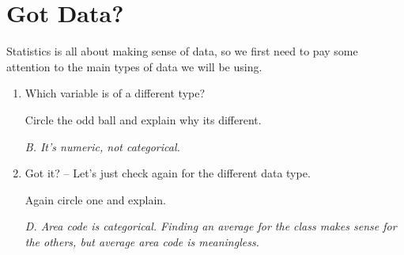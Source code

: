 \def\theTopic{Descriptive Stats }
\def\dayNum{2}

\section{ Got Data?}

Statistics is all about making sense of data, so we first need to pay
some attention to the main types of data we will be using.

\begin{enumerate}
  \item Which  variable is of a  different type?
     Circle the odd ball and explain why its different.
\begin{students}
    \vspace{1cm}    
\end{students}

\begin{key}
  {\it B.  It's numeric, not categorical.}       
\end{key}

\item Got it?  -- Let's just check again for the different data type.
   Again circle one and explain.
\begin{students}
    \vspace{1cm}
\end{students}

\begin{key}
  {\it D.  Area code is categorical. Finding an average for the class
    makes sense for the others, but average area code is meaningless.}       
\end{key}
\end{enumerate}

